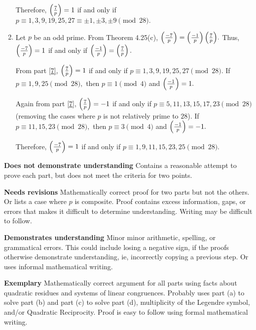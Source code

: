 \documentclass[letterpaper, 11pt]{ximera}
\begin{document}
\begin{ex}
\begin{solution}
\begin{enumerate}[label=(\alph*)]
		Therefore, $\left(\frac{7}{p}\right)=1$ if and only if $p\equiv 1,3,9,19,25,27\equiv \pm1, \pm 3,\pm 9 \pmod{28}.$

		\item Let $p$ be an odd prime.	From Theorem 4.25(c), $\left(\frac{-7}{p}\right)= {\left(\frac{-1}{p}\right)\left(\frac{7}{p}\right)}.$ Thus, $\left(\frac{-7}{p}\right)=1$ if and only if $\left(\frac{-1}{p}\right)=\left(\frac{7}{p}\right).$ 
		
		From part \ref{7}, $\left(\frac{7}{p}\right)=1$ if and only if $p\equiv 1,3,9,19,25,27 \pmod{28}.$ If $p\equiv 1, 9, 25 \pmod{28},$ then $p\equiv 1\pmod{4}$ and $\left(\frac{-1}{p}\right)=1.$

		Again from part \ref{7}, $\left(\frac{7}{p}\right)=-1$ if and only if $p\equiv 5,11,13,15,17,23 \pmod{28}$ (removing the cases where $p$ is not relatively prime to $28$). If $p\equiv 11,15,23 \pmod{28},$ then $p\equiv 3\pmod{4}$ and $\left(\frac{-1}{p}\right)=-1.$
		
		Therefore, $\left(\frac{-7}{p}\right)=1$ if and only if $p\equiv 1,9,11,15,23,25\pmod{28}.$
	\end{enumerate}
	\end{solution}


\begin{writeRubric}
    \item \textbf{Does not demonstrate understanding}
     Contains a reasonable attempt to prove each part, but does not meet the criteria for two points.
    \item \textbf{Needs revisions} Mathematically correct proof for two parts but not the others. Or lists a case where $p$ is composite. Proof contains excess information, gaps, or errors that makes it difficult to determine understanding. Writing may be difficult to follow. 
     
    \item \textbf{Demonstrates understanding} Minor minor arithmetic, spelling, or grammatical errors. This could include losing a negative sign, if the proofs otherwise demonstrate understanding, ie, incorrectly copying a previous step. Or uses informal mathematical writing.
    
    \item \textbf{Exemplary} Mathematically correct argument for all parts using facts about quadratic residues and systems of linear congruences. Probably uses part (a) to solve part (b) and part (c) to solve part (d), multiplicity of the Legendre symbol, and/or Quadratic Reciprocity. Proof is easy to follow using formal mathematical writing.
\end{writeRubric}
\end{ex}
\end{document}
